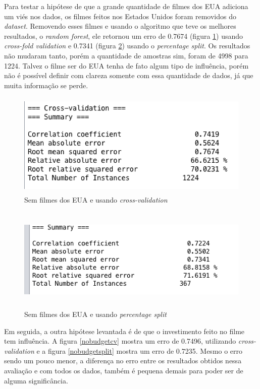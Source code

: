 Para testar a hipótese de que a grande quantidade de filmes dos EUA adiciona um viés nos dados, os filmes feitos nos Estados Unidos foram removidos do \textit{dataset}. Removendo esses filmes e usando o algoritmo que teve os melhores resultados, o \textit{random forest}, ele retornou um erro de 0.7674 (figura \ref{nousacv}) usando \textit{cross-fold validation} e 0.7341 (figura \ref{nousasplit}) usando o \textit{percentage split}. Os resultados não mudaram tanto, porém a quantidade de amostras sim, foram de 4998 para 1224. Talvez o filme ser do EUA tenha de fato algum tipo de influência, porém não é possível definir com clareza somente com essa quantidade de dados, já que muita informação se perde.

\begin{figure}[H]
\centering
\includegraphics[height=5cm]{imagens/sem_usa_cv.png}
\caption{Sem filmes dos EUA e usando \textit{cross-validation}}
\label{nousacv}
\end{figure}

\begin{figure}[H]
\centering
\includegraphics[height=5cm]{imagens/sem_usa_split.png}
\caption{Sem filmes dos EUA e usando \textit{percentage split}}
\label{nousasplit}
\end{figure}


Em seguida, a outra hipótese levantada é de que o investimento feito no filme tem influência. A figura \ref{nobudgetcv} mostra um erro de 0.7496, utilizando \textit{cross-validation} e a figura \ref{nobudgetsplit} mostra um erro de 0.7235. Mesmo o erro sendo um pouco menor, a diferença no erro entre os resultados obtidos nessa avaliação e com todos os dados, também é pequena demais para poder ser de alguma significância.

